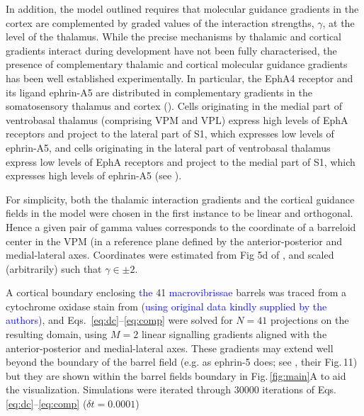 \documentclass[9pt,lineno]{elife}
\newcommand{\cmnt}[1]{\textcolor{blue}{#1}}
\newcommand{\mpfour}[1]{\textcolor{revgreen}{#1}}
\newcommand{\justifygammas}[1]{\textcolor{revpink}{#1}}
\begin{document}
\justifygammas{In addition, the model outlined requires that molecular
  guidance gradients in the cortex are complemented by graded values of the
  interaction strengths, $\gamma$, at the level of the thalamus. While the
  precise mechanisms by thalamic and cortical gradients interact during
  development have not been fully characterised, the presence of complementary
  thalamic and cortical molecular guidance gradients has been well established
  experimentally. In particular, the EphA4 receptor and its ligand ephrin-A5
  are distributed in complementary gradients in the somatosensory thalamus and
  cortex} (\citealp{vanderhaeghen_mapping_2000,miller_epha7-ephrin-a5_2006}).
\justifygammas{Cells originating in the medial part of ventrobasal thalamus
  (comprising VPM and VPL) express high levels of EphA receptors and project
  to the lateral part of S1, which expresses low levels of ephrin-A5, and
  cells originating in the lateral part of ventrobasal thalamus express low
  levels of EphA receptors and project to the medial part of S1, which
  expresses high levels of ephrin-A5} (see
\citealp{gao_regulation_1998,dufour_area_2003,vanderhaeghen_developmental_2004,speer_grading_2005,torii_role_2013}).

\justifygammas{For simplicity, both the thalamic interaction gradients and the
  cortical guidance fields in the model were chosen in the first instance to
  be linear and orthogonal. Hence a given pair of gamma values corresponds to
  the coordinate of a barreloid center in the VPM (in a reference plane
  defined by the anterior-posterior and medial-lateral axes. Coordinates were
  estimated from Fig 5d of} \citep{haidarliu_size_2001}, \justifygammas{and
  scaled (arbitrarily) such that $\gamma\in\pm 2$.}

A cortical boundary enclosing \cmnt{the} 41 \cmnt{macrovibrissae} barrels was
traced from a cytochrome oxidase stain from \cite{zheng_signal_2001}
\cmnt{(using original data kindly supplied by the authors)}, and
Eqs.~\ref{eq:dc}--\ref{eq:comp} were solved for $N=41$ projections on the
resulting domain, using $M=2$ linear signalling gradients aligned with the
anterior-posterior and medial-lateral axes.  \mpfour{These gradients may
  extend well beyond the boundary of the barrel field (e.g. as ephrin-5 does;
  see \citealp{miller_epha7-ephrin-a5_2006}, their Fig.\,11) but they are
  shown within the barrel fields boundary in Fig.\,\ref{fig:main}A to aid the
  visualization. Simulations were iterated through 30000 iterations of
  Eqs.\,\ref{eq:dc}--\ref{eq:comp} ($\delta t=0.0001$)}
\end{document}
